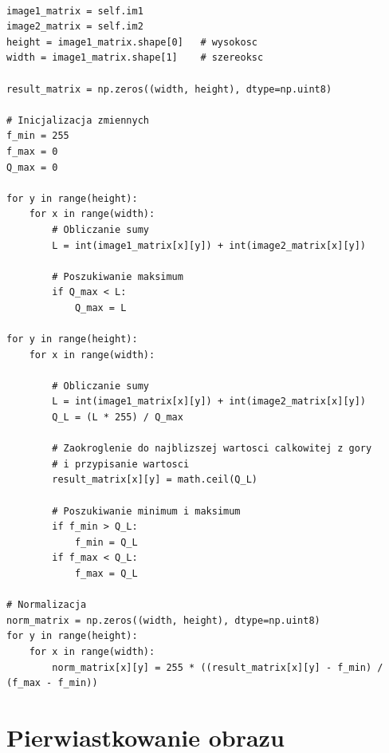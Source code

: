 \documentclass[final,a4paper,openany,12pt]{mwbk}
\begin{document}
\begin{lstlisting}[caption=Dzielenie obrazu szarego przez przez inny obraz]

image1_matrix = self.im1
image2_matrix = self.im2
height = image1_matrix.shape[0]   # wysokosc
width = image1_matrix.shape[1]    # szereoksc

result_matrix = np.zeros((width, height), dtype=np.uint8)

# Inicjalizacja zmiennych
f_min = 255
f_max = 0
Q_max = 0

for y in range(height):
    for x in range(width):  
        # Obliczanie sumy
        L = int(image1_matrix[x][y]) + int(image2_matrix[x][y])
        
        # Poszukiwanie maksimum
        if Q_max < L:
            Q_max = L

for y in range(height):
    for x in range(width):  

        # Obliczanie sumy
        L = int(image1_matrix[x][y]) + int(image2_matrix[x][y])
        Q_L = (L * 255) / Q_max

        # Zaokroglenie do najblizszej wartosci calkowitej z gory
        # i przypisanie wartosci
        result_matrix[x][y] = math.ceil(Q_L)

        # Poszukiwanie minimum i maksimum
        if f_min > Q_L:
            f_min = Q_L
        if f_max < Q_L:
            f_max = Q_L

# Normalizacja
norm_matrix = np.zeros((width, height), dtype=np.uint8)
for y in range(height):
    for x in range(width):
        norm_matrix[x][y] = 255 * ((result_matrix[x][y] - f_min) / (f_max - f_min))

\end{lstlisting}


\section {Pierwiastkowanie obrazu}
\hfill
\\\\
\indent
\end{document}
